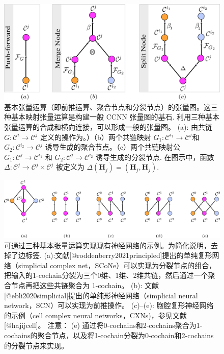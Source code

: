 \documentclass[
  12pt,
]{krantz}
\begin{document}
\begin{figure}

{\centering \includegraphics{figures/split_merge_push} 

}

\caption{基本张量运算（即前推运算、聚合节点和分裂节点）的张量图。这三种基本映射张量运算是构建一般 CCNN 张量图的基石. 利用三种基本张量运算的合成和横向连接，可以形成一般的张量图。 (a): 由共链 $G\colon\mathcal{C}^i \to \mathcal{C}^j$ 定义的操作为。）（b）两个共链映射 $G_1\colon\mathcal{C}^{i_1} \to \mathcal{C}^j$和$G_2\colon\mathcal{C}^{i_2} \to \mathcal{C}^j$ 诱导生成的聚合节点。（c）两个共链映射公 $G_1\colon\mathcal{C}^{j}\to\mathcal{C}^{i_1}$ 和 $G_2\colon\mathcal{C}^{j}\to\mathcal{C}^{i_2}$ 诱导生成的分裂节点. 在图示中，函数 $\Delta \colon \mathcal{C}^{j}\to \mathcal{C}^{j}\times \mathcal{C}^{j}$ 被定义为 $\Delta(\mathbf{H}_j)= (\mathbf{H}_j,\mathbf{H}_j)$.}\label{fig:split-merge-pushforward}
\end{figure}

\begin{figure}

{\centering \includegraphics{figures/prior_work} 

}

\caption{可通过三种基本张量运算实现现有神经网络的示例。为简化说明，去掉了边标签. (a):文献[@roddenberry2021principled]提出的单纯复形网络（simplicial complex net，SCoNe）可以实现为分裂节点的组合，把输入的1-cochain分裂为三个0维、1维、2维共链，然后通过一个聚合节点再把这些共链聚合为 1-cochain。 (b): 文献[@ebli2020simplicial]提出的单纯形神经网络（simplicial neural network，SCN）可以实现为前推操作。 (c)--(e): 胞腔复形神经网络的示例（cell complex neural networks，CXNs)，参见文献 [@hajijcell]。 注意： (e) 通过将0-cochains和2-cochains聚合为1-cochains的聚合节点，以及将1-cochain分裂为0-cochain和2-cochains的分裂节点来实现。}\label{fig:prior-work}
\end{figure}
\end{document}
